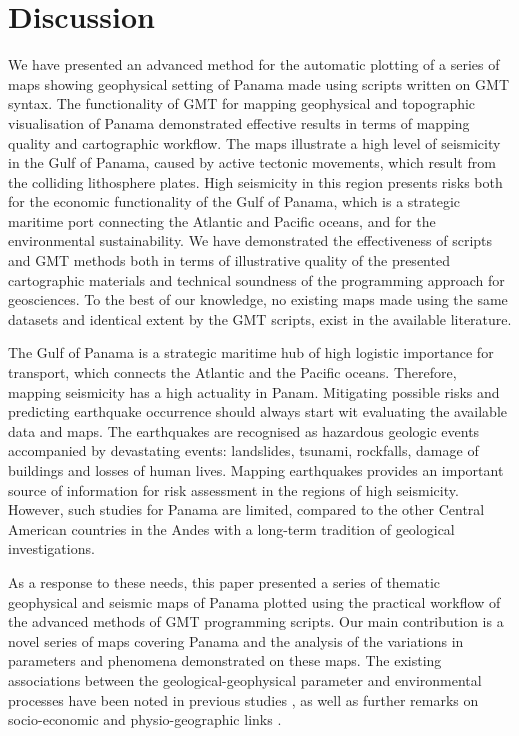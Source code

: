 \documentclass[USenglish,twocolumn]{article}
\begin{document}
\section{Discussion}
We have presented an advanced method for the automatic plotting of a series of maps showing geophysical setting of Panama made using scripts written on GMT syntax. The functionality of GMT for mapping geophysical and topographic visualisation of Panama demonstrated effective results in terms of mapping quality and cartographic workflow. The maps illustrate a high level of seismicity in the Gulf of Panama, caused by active tectonic movements, which result from the colliding lithosphere plates. High seismicity in this region presents risks both for the economic functionality of the Gulf of Panama, which is a strategic maritime port connecting the Atlantic and Pacific oceans, and for the environmental sustainability. We have demonstrated the effectiveness of scripts and GMT methods both in terms of illustrative quality of the presented cartographic materials and technical soundness of the programming approach for geosciences. To the best of our knowledge, no existing maps made using the same datasets and identical extent by the GMT scripts, exist in the available literature.

The Gulf of Panama is a strategic maritime hub of high logistic importance for transport, which connects the Atlantic and the Pacific oceans. Therefore, mapping seismicity has a high actuality in Panam. Mitigating possible risks and predicting earthquake occurrence should always start wit evaluating the available data and maps. The earthquakes are recognised as hazardous geologic events accompanied by devastating events: landslides, tsunami, rockfalls, damage of buildings and losses of human lives. Mapping earthquakes provides an important source of information for risk assessment in the regions of high seismicity. However, such studies for Panama are limited, compared to the other Central American countries in the Andes with a long-term tradition of geological investigations.

As a response to these needs, this paper presented a series of thematic geophysical and seismic maps of Panama plotted using the practical workflow of the advanced methods of GMT programming scripts. Our main contribution is a novel series of maps covering Panama and the analysis of the variations in parameters and phenomena demonstrated on these maps. The existing associations between the geological-geophysical parameter and environmental processes have been noted in previous studies \citep{LANDAVERDEGONZALEZ2020105329,RIBEIROSOUZA2022101570,SOHEL2022100226}, as well as further remarks on socio-economic and physio-geographic links \citep{AVELAR200927,WRIGHTWENDEL2012272}. 
\end{document}
